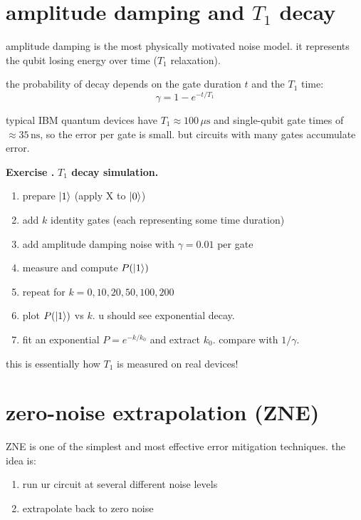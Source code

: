 \documentclass[11pt,a4paper]{article}
\theoremstyle{definition}
\theoremstyle{remark}
\newcounter{exercise}[section]
\newenvironment{exercise}{\refstepcounter{exercise}\par\medskip\noindent\textbf{Exercise \theexercise.}\rmfamily}{\medskip}
\begin{document}
\section{amplitude damping and $T_1$ decay}

amplitude damping is the most physically motivated noise model. it represents the qubit losing energy over time ($T_1$ relaxation).

the probability of decay depends on the gate duration $t$ and the $T_1$ time:
\[
\gamma = 1 - e^{-t/T_1}
\]

typical IBM quantum devices have $T_1 \approx 100\,\mu\text{s}$ and single-qubit gate times of $\approx 35\,\text{ns}$, so the error per gate is small. but circuits with many gates accumulate error.

\begin{exercise}
\textbf{$T_1$ decay simulation.}
\begin{enumerate}[leftmargin=*]
  \item prepare $\ket{1}$ (apply X to $\ket{0}$)
  \item add $k$ identity gates (each representing some time duration)
  \item add amplitude damping noise with $\gamma = 0.01$ per gate
  \item measure and compute $P(\ket{1})$
  \item repeat for $k = 0, 10, 20, 50, 100, 200$
  \item plot $P(\ket{1})$ vs $k$. u should see exponential decay.
  \item fit an exponential $P = e^{-k/k_0}$ and extract $k_0$. compare with $1/\gamma$.
\end{enumerate}

this is essentially how $T_1$ is measured on real devices!
\end{exercise}

\section{zero-noise extrapolation (ZNE)}

ZNE is one of the simplest and most effective error mitigation techniques. the idea is:
\begin{enumerate}[leftmargin=*]
  \item run ur circuit at several different noise levels
  \item extrapolate back to zero noise
\end{enumerate}
\end{document}
